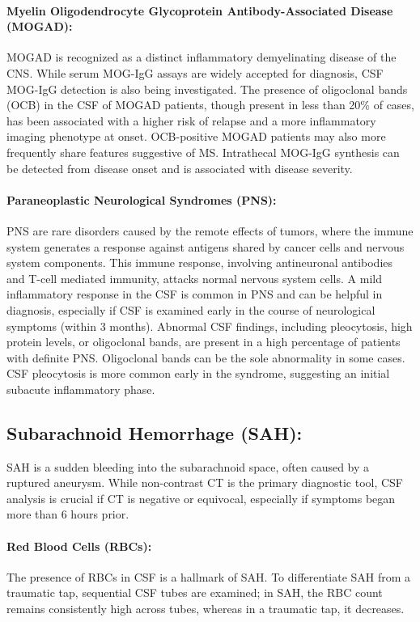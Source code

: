 	\paragraph{Myelin Oligodendrocyte Glycoprotein Antibody-Associated Disease (MOGAD):} MOGAD is recognized as a distinct inflammatory demyelinating disease of the CNS. While serum MOG-IgG assays are widely accepted for diagnosis, CSF MOG-IgG detection is also being investigated. The presence of oligoclonal bands (OCB) in the CSF of MOGAD patients, though present in less than 20\% of cases, has been associated with a higher risk of relapse and a more inflammatory imaging phenotype at onset. OCB-positive MOGAD patients may also more frequently share features suggestive of MS. Intrathecal MOG-IgG synthesis can be detected from disease onset and is associated with disease severity.
	
	\paragraph{Paraneoplastic Neurological Syndromes (PNS):} PNS are rare disorders caused by the remote effects of tumors, where the immune system generates a response against antigens shared by cancer cells and nervous system components. This immune response, involving antineuronal antibodies and T-cell mediated immunity, attacks normal nervous system cells. A mild inflammatory response in the CSF is common in PNS and can be helpful in diagnosis, especially if CSF is examined early in the course of neurological symptoms (within 3 months). Abnormal CSF findings, including pleocytosis, high protein levels, or oligoclonal bands, are present in a high percentage of patients with definite PNS. Oligoclonal bands can be the sole abnormality in some cases. CSF pleocytosis is more common early in the syndrome, suggesting an initial subacute inflammatory phase.
	
	\subsection*{Subarachnoid Hemorrhage (SAH):}
	
	SAH is a sudden bleeding into the subarachnoid space, often caused by a ruptured aneurysm. While non-contrast CT is the primary diagnostic tool, CSF analysis is crucial if CT is negative or equivocal, especially if symptoms began more than 6 hours prior.
	
	\paragraph{Red Blood Cells (RBCs):} The presence of RBCs in CSF is a hallmark of SAH. To differentiate SAH from a traumatic tap, sequential CSF tubes are examined; in SAH, the RBC count remains consistently high across tubes, whereas in a traumatic tap, it decreases.
	
